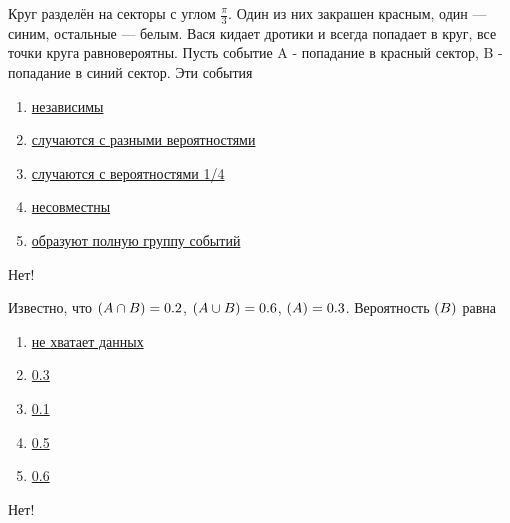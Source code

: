 \documentclass[t]{beamer}
\let\P\relax
\DeclareMathOperator{\P}{\mathbb{P}}
\begin{document}
 \begin{frame} \label{10-No} 
\begin{block}{10} 

Круг разделён на секторы с углом $\frac{\pi}{3}$. Один из них закрашен красным, один — синим, остальные — белым. Вася кидает дротики и всегда попадает в круг, все точки круга равновероятны. Пусть событие A - попадание в красный сектор, B - попадание в синий сектор. Эти события

  


 \end{block} 
\begin{enumerate} 
\item[] \hyperlink{10-No}{\beamergotobutton{} независимы}
\item[] \hyperlink{10-No}{\beamergotobutton{} случаются с разными вероятностями}
\item[] \hyperlink{10-No}{\beamergotobutton{} случаются с вероятностями 1/4}
\item[] \hyperlink{10-Yes}{\beamergotobutton{} несовместны}
\item[] \hyperlink{10-No}{\beamergotobutton{} образуют полную группу событий}
\end{enumerate} 

 \alert{Нет!} 
\end{frame} 


 \begin{frame} \label{11-No} 
\begin{block}{11} 

Известно, что $\P(A \cap B) = 0.2$, $\P(A \cup B) = 0.6$, $\P(A) = 0.3$. Вероятность $\P(B)$ равна

  


 \end{block} 
\begin{enumerate} 
\item[] \hyperlink{11-No}{\beamergotobutton{} не хватает данных}
\item[] \hyperlink{11-No}{\beamergotobutton{} 0.3}
\item[] \hyperlink{11-No}{\beamergotobutton{} 0.1}
\item[] \hyperlink{11-Yes}{\beamergotobutton{} 0.5}
\item[] \hyperlink{11-No}{\beamergotobutton{} 0.6}
\end{enumerate} 

 \alert{Нет!} 
\end{frame} 
\end{document}
